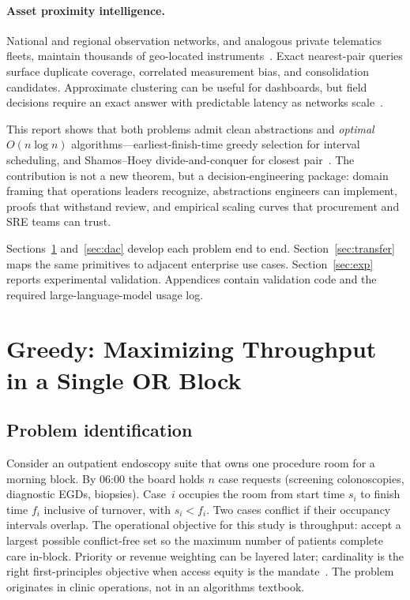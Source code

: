 \documentclass[sigconf,review=false]{acmart}
\theoremstyle{definition}
\begin{document}
\paragraph{Asset proximity intelligence.}
National and regional observation networks, and analogous private
telematics fleets, maintain thousands of geo-located
instruments~\cite{noaa2020}. Exact nearest-pair queries surface duplicate
coverage, correlated measurement bias, and consolidation candidates.
Approximate clustering can be useful for dashboards, but field decisions
require an exact answer with predictable latency as networks
scale~\cite{deberg2008,cardenas2013}.

This report shows that both problems admit clean abstractions and
\emph{optimal} $O(n\log n)$ algorithms---earliest-finish-time greedy
selection for interval scheduling, and Shamos--Hoey divide-and-conquer for
closest pair~\cite{kt2005,clrs2009,shamos1975}. The contribution is not a
new theorem, but a decision-engineering package: domain framing that
operations leaders recognize, abstractions engineers can implement,
proofs that withstand review, and empirical scaling curves that
procurement and SRE teams can trust.

Sections~\ref{sec:greedy} and~\ref{sec:dac} develop each problem end to
end. Section~\ref{sec:transfer} maps the same primitives to adjacent
enterprise use cases. Section~\ref{sec:exp} reports experimental
validation. Appendices contain validation code and the required
large-language-model usage log.

\section{Greedy: Maximizing Throughput in a Single OR Block}
\label{sec:greedy}

\subsection{Problem identification}
\label{sec:greedy-id}

Consider an outpatient endoscopy suite that owns one procedure room for a
morning block. By 06:00 the board holds $n$ case requests (screening
colonoscopies, diagnostic EGDs, biopsies). Case~$i$ occupies the room from
start time $s_i$ to finish time $f_i$ inclusive of turnover, with
$s_i < f_i$. Two cases conflict if their occupancy intervals overlap. The
operational objective for this study is throughput: accept a largest
possible conflict-free set so the maximum number of patients complete care
in-block. Priority or revenue weighting can be layered later; cardinality
is the right first-principles objective when access equity is the
mandate~\cite{gupta2015or,cayirli2003}. The problem originates in clinic
operations, not in an algorithms textbook.
\end{document}
